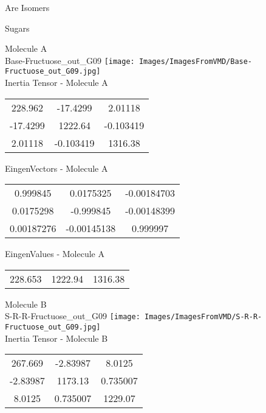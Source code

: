 \begin{center}
\vtab
\vtab
\textcolor{NavyBlue}{\Large Are Isomers}
\end{center}
\newpage

\vtab[-2cm]
\begin{center}
{\large Sugars}
\end{center}
\begin{multicols}{2}
\begin{center}
Molecule A \\ 
Base-Fructuose\_out\_G09
\texttt{[image: Images/ImagesFromVMD/Base-Fructuose\_out\_G09.jpg]}
\\
Inertia Tensor - Molecule A \\
\vtab
\begin{tabular}{|c c c|}
228.962	 & 	-17.4299	 & 	2.01118	 \\
-17.4299	 & 	1222.64	 & 	-0.103419	 \\
2.01118	 & 	-0.103419	 & 	1316.38
\end{tabular}

\vtab
 EingenVectors - Molecule A     \\
\vtab
\begin{tabular}{|c c c|}
0.999845	 & 	0.0175325	 & 	-0.00184703	 \\
0.0175298	 & 	-0.999845	 & 	-0.00148399	 \\
0.00187276	 & 	-0.00145138	 & 	0.999997
\end{tabular}

\vtab
 EingenValues - Molecule A     \\
\vtab
\begin{tabular}{|c c c|}
228.653	 & 	1222.94	 & 	1316.38
\end{tabular}
\columnbreak

Molecule B \\ 
S-R-R-Fructuose\_out\_G09
\texttt{[image: Images/ImagesFromVMD/S-R-R-Fructuose\_out\_G09.jpg]}
\\
Inertia Tensor - Molecule B \\
\vtab
\begin{tabular}{|c c c|}
267.669	 & 	-2.83987	 & 	8.0125	 \\
-2.83987	 & 	1173.13	 & 	0.735007	 \\
8.0125	 & 	0.735007	 & 	1229.07
\end{tabular}


\end{center}
\end{multicols}
